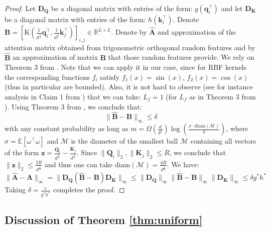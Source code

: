 \begin{proof}
Let $\mathbf{D}_{\mathbf{Q}}$ be a diagonal matrix with entries of the form: $g(\mathbf{q}_{i}^{\top})$ and let $\mathbf{D}_{\mathbf{K}}$ be a diagonal matrix with entries of the form: $h(\mathbf{k}_{i}^{\top})$. Denote 
$\mathbf{B}=[\mathrm{K}(\frac{1}{d^{\frac{1}{4}}}\mathbf{q}_{i}^{\top},\frac{1}{d^{\frac{1}{4}}}\mathbf{k}_{j}^{\top})]_{i,j} \in \mathbb{R}^{L \times L}$. Denote by $\widehat{\mathbf{A}}$ and approximation of the attention matrix obtained from trigonometric orthogonal random features and by $\widehat{\mathbf{B}}$ an approximation of matrix $\mathbf{B}$ that those random features provide.
We rely on Theorem 3 from \citep{Lin2020DemystifyingOM}.
Note that we can apply it in our case, since for RBF kernels the corresponding functions $f_{i}$ satisfy $f_{1}(x) = \sin(x)$, $f_{2}(x) = \cos(x)$ (thus in particular are bounded). Also, it is not hard to observe (see for instance analysis in  Claim 1 from \citep{fourierapprox}) that we can take: $L_{f}=1$ (for $L_{f}$ as in Theorem 3 from \citep{Lin2020DemystifyingOM}). 
Using Theorem 3 from \citep{Lin2020DemystifyingOM}, we conclude that:
\begin{equation}
\|\widehat{\mathbf{B}}-\mathbf{B}\|_{\infty} \leq \delta    
\end{equation}
with any constant probability as long as
$m = \Omega(\frac{d}{\delta^{2}})\log(\frac{\sigma \cdot  \mathrm{diam}(\mathcal{M})}{\delta})$,
where $\sigma=\mathbb{E}[\omega^{\top}\omega]$ and $\mathcal{M}$ is the diameter of the smallest ball $\mathcal{M}$ containing all vectors of the form $\mathbf{z} = \frac{\mathbf{Q}_{i}}{d^{\frac{1}{4}}}-\frac{\mathbf{K}_{j}}{d^{\frac{1}{4}}}$. 
Since $\|\mathbf{Q}_{i}\|_{2}, \|\mathbf{K}_{j}\|_{2} \leq R$, we conclude that $\|\mathbf{z}\|_{2} \leq \frac{2R}{d^{\frac{1}{4}}}$ and thus one can take $\mathrm{diam}(\mathcal{M})=\frac{4R}{d^{\frac{1}{4}}}$.
We have:
\begin{equation}
\|\widehat{\mathbf{A}}-\mathbf{A}\|_{\infty} = \|\mathbf{D}_{\mathbf{Q}}(\widehat{\mathbf{B}}-\mathbf{B})\mathbf{D}_{\mathbf{K}}\|_{\infty} \leq 
\|\mathbf{D}_{\mathbf{Q}}\|_{\infty}
\|\widehat{\mathbf{B}}-\mathbf{B}\|_{\infty}
\|\mathbf{D}_{\mathbf{K}}\|_{\infty} \leq \delta g^{*}h^{*}
\end{equation}
Taking $\delta = \frac{\epsilon}{g^{*}h^{*}}$ completes the proof.
\end{proof}

\subsection{Discussion of Theorem \ref{thm:uniform}} \label{sec:ball}


